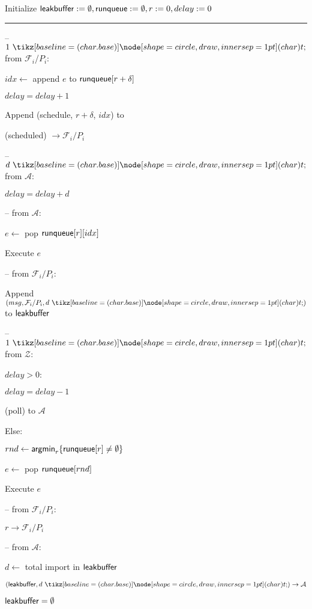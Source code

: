 \begin{bbox}[title={\textbf{Wrapper} $\mathcal{W}_{\msf{sync}}$}]

Initialize ${\mathsf {leakbuffer}} := \emptyset, {\mathsf {runqueue}} := \emptyset, r := 0, delay := 0$

\vspace{2mm} \hrule \vspace{2mm}

-- \OnInput {} $1 \token$ from $\mathcal{F}_i$/$P_i$:

	\qquad $idx \leftarrow$ append $e$ to ${\mathsf {runqueue}}[r+ \delta]$

	\qquad $delay = delay + 1$

	\qquad Append (schedule, $r + \delta$, $idx$) to 

	\qquad \Send (scheduled) $\rightarrow \mathcal{F}_i/P_i$

-- \OnInput {} $d \token$ from $\mathcal{A}$:

	\qquad $delay = delay + d$

-- \OnInput {} from $\mathcal{A}$:
	
	\qquad $e \leftarrow$ pop ${\mathsf {runqueue}}[r][idx]$

	\qquad Execute $e$

-- \OnInput {} from $\mathcal{F}_i/P_i$:

	\qquad Append $(msg, \mathcal{F}_i/P_i, d \token)$ to ${\mathsf {leakbuffer}}$

-- \OnInput {} $1 \token$ from $\mathcal{Z}$:

	\qquad \If $delay > 0$:

		\qqquad $delay = delay - 1$

		\qqquad \Send (poll) to $\mathcal{A}$
	
	\qquad Else: 

		\qqquad $rnd \leftarrow {\mathsf {argmin}}_{r}\{ {\mathsf {runqueue}}[r] \neq \emptyset \}$

		\qqquad $e \leftarrow$ pop ${\mathsf {runqueue}}[rnd]$

		\qqquad Execute $e$

-- \OnInput {} from $\mathcal{F}_i/P_i$:

	\qquad \Send $r \rightarrow \mathcal{F}_i/P_i$

-- \OnInput {} from $\mathcal{A}$:

	\qquad $d \leftarrow$ total import in ${\mathsf {leakbuffer}}$

	\qquad \Send $(\msf{leakbuffer}, d \token) \rightarrow \mathcal{A}$

	\qquad ${\mathsf {leakbuffer}} = \emptyset$

\end{bbox}
